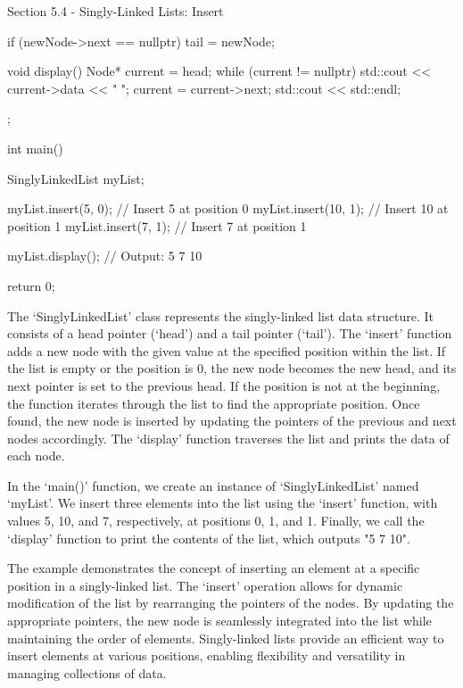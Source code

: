 \begin{notes}{Section 5.4 - Singly-Linked Lists: Insert}
\begin{highlight}
\begin{code}[C++]
{{{                if (newNode->next == nullptr) {
                    tail = newNode;
                }
            }
        }
    
        void display() {
            Node* current = head;
            while (current != nullptr) {
                std::cout << current->data << " ";
                current = current->next;
            }
            std::cout << std::endl;
        }
    };
    
    int main() {
        SinglyLinkedList myList;
    
        myList.insert(5, 0);   // Insert 5 at position 0
        myList.insert(10, 1);  // Insert 10 at position 1
        myList.insert(7, 1);   // Insert 7 at position 1
    
        myList.display();  // Output: 5 7 10
    
        return 0;
    }        
    \end{code}
        The `SinglyLinkedList' class represents the singly-linked list data structure. It consists of a head pointer (`head') and a tail pointer (`tail'). The `insert' function adds a new node with the given value at the specified position within the 
        list. If the list is empty or the position is 0, the new node becomes the new head, and its next pointer is set to the previous head. If the position is not at the beginning, the function iterates through the list to find the appropriate position. 
        Once found, the new node is inserted by updating the pointers of the previous and next nodes accordingly. The `display' function traverses the list and prints the data of each node.
    
        In the `main()' function, we create an instance of `SinglyLinkedList' named `myList'. We insert three elements into the list using the `insert' function, with values 5, 10, and 7, respectively, at positions 0, 1, and 1. Finally, we call the `display' 
        function to print the contents of the list, which outputs "5 7 10".
    
        The example demonstrates the concept of inserting an element at a specific position in a singly-linked list. The `insert' operation allows for dynamic modification of the list by rearranging the pointers of the nodes. By updating the appropriate 
        pointers, the new node is seamlessly integrated into the list while maintaining the order of elements. Singly-linked lists provide an efficient way to insert elements at various positions, enabling flexibility and versatility in managing collections of data.
    \end{highlight}
\end{notes}

